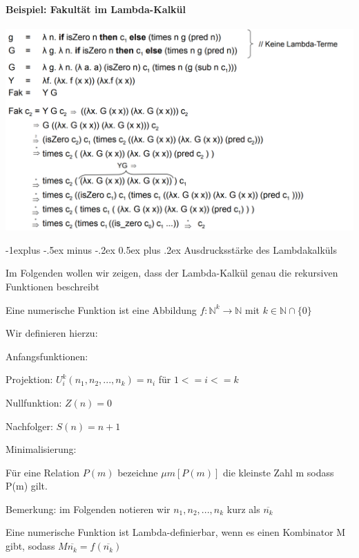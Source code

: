 \documentclass[10pt]{article}
\makeatletter
\renewcommand{\subsection}{\@startsection{subsection}{2}{0mm}%
                                {-1explus -.5ex minus -.2ex}%
                                {0.5ex plus .2ex}%
                                {\normalfont\normalsize\bfseries}}
\makeatother
\begin{document}
  \paragraph{Beispiel: Fakultät im Lambda-Kalkül}
  \includegraphics[width=.4\linewidth]{Assets/Programmierparadigmen-Lambda_Abstraktion}
  
  \subsection{Ausdrucksstärke des Lambdakalküls}
  \begin{itemize*}
    \item Im Folgenden wollen wir zeigen, dass der Lambda-Kalkül genau die rekursiven Funktionen beschreibt
    \item Eine numerische Funktion ist eine Abbildung $f:\mathbb{N}^k \rightarrow \mathbb{N}$ mit $k\in\mathbb{N} \cap \{0\}$
    \item Wir definieren hierzu:
    \begin{itemize*}
      \item Anfangsfunktionen:
      \begin{itemize*}
        \item Projektion: $U_i^k (n_1,n_2,...,n_k) = n_i$ für $1<=i<=k$
        \item Nullfunktion: $Z(n) = 0$
        \item Nachfolger: $S(n) = n+1$
      \end{itemize*}
      \item Minimalisierung:
      \begin{itemize*}
        \item Für eine Relation $P(m)$ bezeichne $\mu m[P(m)]$ die kleinste Zahl m sodass P(m) gilt.
      \end{itemize*}
    \end{itemize*}
    \item Bemerkung: im Folgenden notieren wir $n_1,n_2,...,n_k$ kurz als $\overline{n_k}$
    \item Eine numerische Funktion ist Lambda-definierbar, wenn es einen Kombinator M gibt, sodass $M\overline{n_k} = f(\overline{n_k})$
  \end{itemize*}
  
\end{document}
